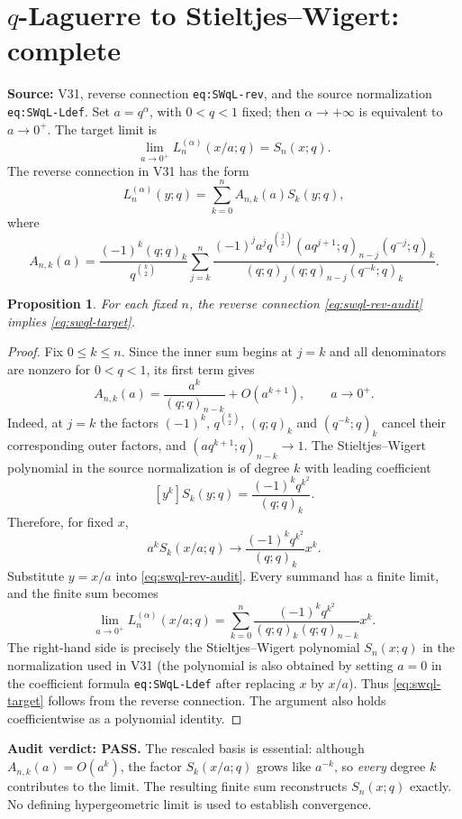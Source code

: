 \documentclass[11pt]{article}
\newtheorem{proposition}{Proposition}
\begin{document}
\section{\texorpdfstring{$q$-Laguerre to Stieltjes--Wigert}{q-Laguerre to Stieltjes--Wigert}: complete}
\noindent\textbf{Source:} V31, reverse connection \texttt{eq:SWqL-rev}, and the source normalization \texttt{eq:SWqL-Ldef}. Set $a=q^\alpha$, with $0<q<1$ fixed; then $\alpha\to+\infty$ is equivalent to $a\to0^+$.
The target limit is
\begin{equation}\label{eq:swql-target}
 \lim_{a\to0^+}L_n^{(\alpha)}(x/a;q)=S_n(x;q).
\end{equation}
The reverse connection in V31 has the form
\begin{equation}\label{eq:swql-rev-audit}
 L_n^{(\alpha)}(y;q)=\sum_{k=0}^n A_{n,k}(a)S_k(y;q),
\end{equation}
where
\[
 A_{n,k}(a)=\frac{(-1)^k(q;q)_k}{q^{\binom{k}{2}}}
 \sum_{j=k}^n \frac{(-1)^j a^j q^{\binom{j}{2}}
 (aq^{j+1};q)_{n-j}(q^{-j};q)_k}
 {(q;q)_j(q;q)_{n-j}(q^{-k};q)_k}.
\]
\begin{proposition}
For each fixed $n$, the reverse connection \eqref{eq:swql-rev-audit} implies \eqref{eq:swql-target}.
\end{proposition}
\begin{proof}
Fix $0\le k\le n$. Since the inner sum begins at $j=k$ and all denominators are nonzero for $0<q<1$, its first term gives
\[
 A_{n,k}(a)=\frac{a^k}{(q;q)_{n-k}}+O(a^{k+1}),\qquad a\to0^+.
\]
Indeed, at $j=k$ the factors $(-1)^k$, $q^{\binom{k}{2}}$, $(q;q)_k$ and $(q^{-k};q)_k$ cancel their corresponding outer factors, and $(aq^{k+1};q)_{n-k}\to1$.
The Stieltjes--Wigert polynomial in the source normalization is of degree $k$ with leading coefficient
\[
 [y^k]S_k(y;q)=\frac{(-1)^kq^{k^2}}{(q;q)_k}.
\]
Therefore, for fixed $x$,
\[
 a^k S_k(x/a;q)\longrightarrow
 \frac{(-1)^kq^{k^2}}{(q;q)_k}x^k.
\]
Substitute $y=x/a$ into \eqref{eq:swql-rev-audit}. Every summand has a finite limit, and the finite sum becomes
\begin{equation}\label{eq:swql-limit-sum}
 \lim_{a\to0^+}L_n^{(\alpha)}(x/a;q)
 =\sum_{k=0}^n\frac{(-1)^kq^{k^2}}{(q;q)_k(q;q)_{n-k}}x^k.
\end{equation}
The right-hand side is precisely the Stieltjes--Wigert polynomial $S_n(x;q)$ in the normalization used in V31 (the polynomial is also obtained by setting $a=0$ in the coefficient formula \texttt{eq:SWqL-Ldef} after replacing $x$ by $x/a$). Thus \eqref{eq:swql-target} follows from the reverse connection. The argument also holds coefficientwise as a polynomial identity.
\end{proof}
\noindent\textbf{Audit verdict: PASS.} The rescaled basis is essential: although $A_{n,k}(a)=O(a^k)$, the factor $S_k(x/a;q)$ grows like $a^{-k}$, so \emph{every} degree $k$ contributes to the limit. The resulting finite sum reconstructs $S_n(x;q)$ exactly. No defining hypergeometric limit is used to establish convergence.
\end{document}

